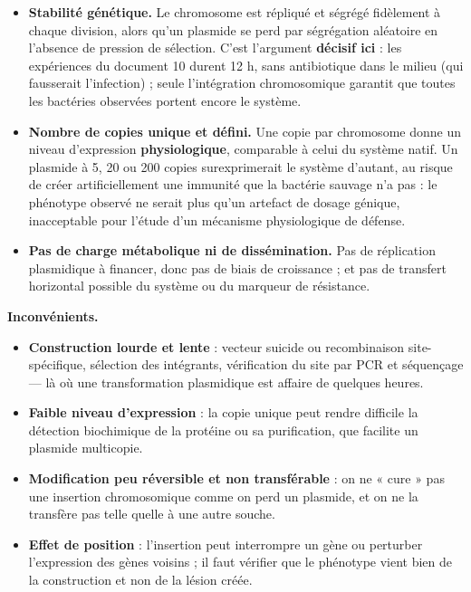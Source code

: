 \documentclass[11pt,a4paper]{article}
\providecommand{\tightlist}{\setlength{\itemsep}{0pt}\setlength{\parskip}{0pt}}
\begin{document}
\begin{itemize}
\tightlist
\item
  \textbf{Stabilité génétique.} Le chromosome est répliqué et ségrégé fidèlement à chaque division, alors qu'un plasmide se perd par ségrégation aléatoire en l'absence de pression de sélection. C'est l'argument \textbf{décisif ici} : les expériences du document 10 durent 12 h, sans antibiotique dans le milieu (qui fausserait l'infection) ; seule l'intégration chromosomique garantit que toutes les bactéries observées portent encore le système.
\item
  \textbf{Nombre de copies unique et défini.} Une copie par chromosome donne un niveau d'expression \textbf{physiologique}, comparable à celui du système natif. Un plasmide à 5, 20 ou 200 copies surexprimerait le système d'autant, au risque de créer artificiellement une immunité que la bactérie sauvage n'a pas : le phénotype observé ne serait plus qu'un artefact de dosage génique, inacceptable pour l'étude d'un mécanisme physiologique de défense.
\item
  \textbf{Pas de charge métabolique ni de dissémination.} Pas de réplication plasmidique à financer, donc pas de biais de croissance ; et pas de transfert horizontal possible du système ou du marqueur de résistance.
\end{itemize}

\textbf{Inconvénients.}

\begin{itemize}
\tightlist
\item
  \textbf{Construction lourde et lente} : vecteur suicide ou recombinaison site-spécifique, sélection des intégrants, vérification du site par PCR et séquençage --- là où une transformation plasmidique est affaire de quelques heures.
\item
  \textbf{Faible niveau d'expression} : la copie unique peut rendre difficile la détection biochimique de la protéine ou sa purification, que facilite un plasmide multicopie.
\item
  \textbf{Modification peu réversible et non transférable} : on ne « cure » pas une insertion chromosomique comme on perd un plasmide, et on ne la transfère pas telle quelle à une autre souche.
\item
  \textbf{Effet de position} : l'insertion peut interrompre un gène ou perturber l'expression des gènes voisins ; il faut vérifier que le phénotype vient bien de la construction et non de la lésion créée.
\end{itemize}
\end{document}
